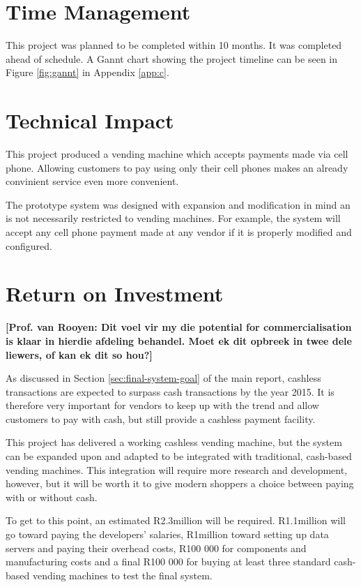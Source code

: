\section{Time Management}

This project was planned to be completed within 10 months. It was completed ahead of
schedule. A Gannt chart showing the project timeline can be seen in Figure \ref{fig:gannt}
in Appendix \ref{app:c}.

\section{Technical Impact}

This project produced a vending machine which accepts payments made via cell phone.
Allowing customers to pay using only their cell phones makes an already convinient service
even more convenient. 

The prototype system was designed with expansion and modification in mind an is not
necessarily restricted to vending machines.
For example, the system will accept any cell phone payment made at any vendor if it is
properly modified and configured. 

\section{Return on Investment}

\textbf{[Prof. van Rooyen: Dit voel vir my die potential for commercialisation is klaar in
hierdie afdeling behandel. Moet ek dit opbreek in twee dele liewers, of kan ek dit so
hou?]}

As discussed in Section \ref{sec:final-system-goal} of the main report, cashless
transactions are expected to surpass cash transactions by the year 2015. It is therefore
very important for vendors to keep up with the trend and allow customers to pay with
cash, but still provide a cashless payment facility. 

This project has delivered a working cashless vending machine, but the system can be
expanded upon and adapted to be integrated with traditional, cash-based vending
machines. This integration will require more research and development, however, but it
will be worth it to give modern shoppers a choice between paying with or without cash.

To get to this point, an estimated R2.3million will be required. R1.1million will go
toward paying the developers' salaries, R1million toward setting up data servers and paying their
overhead costs, R100 000 for components and manufacturing costs and a final R100 000 for
buying at least three standard cash-based vending machines to test the final system. 

